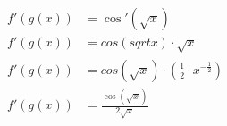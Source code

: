 \documentclass[preview]{standalone}
\begin{document}
\begin{align*}
f'(g(x))&= \cos'(\sqrt{x}) \\ f'(g(x))&=cos(sqrt{x}) \cdot \sqrt{x} \\ f'(g(x))&=cos(\sqrt{x}) \cdot (\frac{1}{2} \cdot x^{-\frac{1}{2}}) \\ f'(g(x))&=\frac{\cos(\sqrt{x})}{2\sqrt{x}}
\end{align*}
\end{document}
